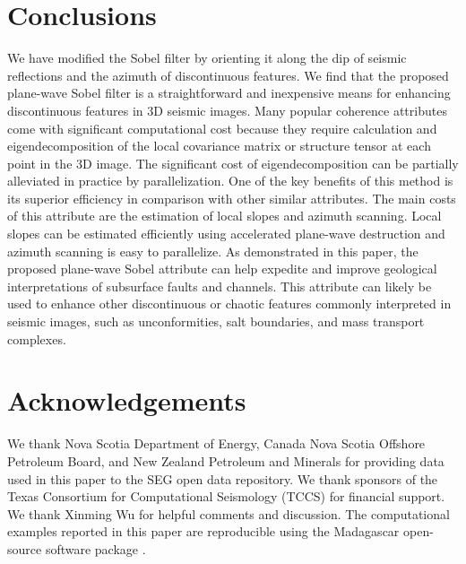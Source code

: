 \section{Conclusions}
We have modified the Sobel filter by orienting it along the dip of seismic reflections and the azimuth of discontinuous features.
We find that the proposed plane-wave Sobel filter is a straightforward and inexpensive means for enhancing discontinuous features in 3{D} seismic images. 
Many popular coherence attributes come with significant computational cost because they require calculation and eigendecomposition of the local covariance matrix or structure tensor at each point in the 3{D} image.
The significant cost of eigendecomposition can be partially alleviated in practice by parallelization.
One of the key benefits of this method is its superior efficiency in comparison with other similar attributes.
The main costs of this attribute are the estimation of local slopes and azimuth scanning.
Local slopes can be estimated efficiently using accelerated plane-wave destruction and azimuth scanning is easy to parallelize.
As demonstrated in this paper, the proposed plane-wave Sobel attribute can help expedite and improve geological interpretations of subsurface faults and channels.
This attribute can likely be used to enhance other discontinuous or chaotic features commonly interpreted in seismic images, such as unconformities, salt boundaries, and mass transport complexes.

\section{Acknowledgements}
We thank Nova Scotia Department of Energy, Canada Nova Scotia Offshore Petroleum Board, and New Zealand Petroleum and Minerals for providing data used in this paper to the SEG open data repository.
We thank sponsors of the Texas Consortium for Computational Seismology (TCCS) for financial support.
We thank Xinming Wu for helpful comments and discussion.
The computational examples reported in this paper are reproducible using the Madagascar open-source software package \cite[]{fomel13}.



